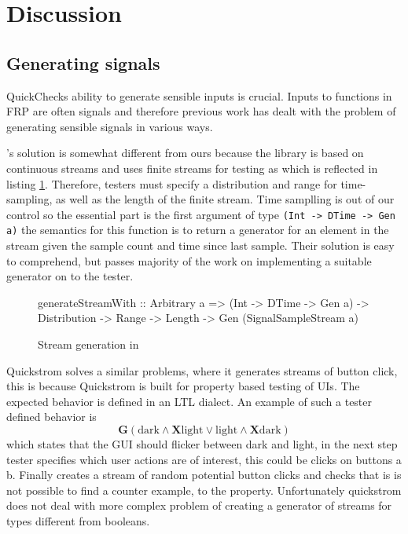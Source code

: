 \section{Discussion}
\subsection{Generating signals}
QuickChecks ability to generate sensible inputs is crucial. Inputs to functions in FRP are often signals and therefore previous work has dealt with the problem of generating sensible signals in various ways.
\par
\cite{runtimeVerification}'s solution is somewhat different from ours because the library is based  on continuous streams and uses finite streams for testing as which is reflected in listing \ref{lst:strGenRV}. Therefore, testers must specify a distribution and range for time-sampling, as well as the length of the finite stream. Time samplling is out of our control so the essential part is the first argument of type \verb|(Int -> DTime -> Gen a)| 
the semantics for this function is to return a generator for an element in the stream given the sample count and time since last sample. Their solution is easy to comprehend, but passes majority of the work on implementing a suitable generator on to the tester.
\begin{figure}[H]
    \centering
    \begin{hscode}
    generateStreamWith :: Arbitrary a
                        => (Int -> DTime -> Gen a) 
                        -> Distribution 
                        -> Range 
                        -> Length
                        -> Gen (SignalSampleStream a)
    \end{hscode}
    \caption{Stream generation in \cite{runtimeVerification}}
    \label{lst:strGenRV}
\end{figure}
\par 
Quickstrom \parencite{quickstrom} solves a similar problems, where it generates streams of button click, this is because Quickstrom is built for property based testing of UIs. The expected behavior is defined in an LTL dialect. An example of such a tester defined behavior is 
$$
    \mathbf{G} (\text{dark} \wedge \mathbf{X} \text{light} \vee \text{light}  \wedge \mathbf{X} \text{dark})
$$
which states that the GUI should flicker between dark and light, in the next step tester specifies which user actions are of interest, this could be clicks on buttons a b. Finally creates a stream of random potential button clicks and checks that is is not possible to find a counter example, to the property. Unfortunately quickstrom does not deal with more complex problem of creating a generator of streams for types different from booleans.





